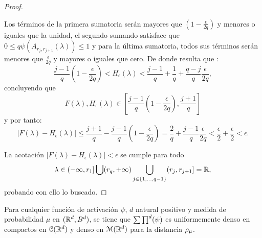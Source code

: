 \begin{proof}
\begin{itemize}
        Los términos de la primera sumatoria serán mayores que $\left(1-\frac{\epsilon}{2q} \right)$ y menores o iguales que la unidad, 
        el segundo sumando satisface que 
        $0 \leq q\psi( A_{r_j, r_{j+1}}(\lambda)) \leq 1$
        y para la última sumatoria, todos sus términos serán menores que $\frac{\epsilon}{2q}$ y mayores o iguales que cero.
        De donde resulta que : 
        \begin{equation}
            \frac{j-1}{q}\left(1-\frac{\epsilon}{2q} \right)  
            <
            H_\epsilon(\lambda) 
            <
            \frac{j-1}{q} 
            + 
            \frac{1}{q} 
            + 
            \frac{q-j}{q} \frac{\epsilon}{2q} ,
        \end{equation}
        concluyendo que 
        \begin{equation}
            F(\lambda), H_\epsilon(\lambda) 
            \in 
            \left[
                \frac{j-1}{q}\left(1-\frac{\epsilon}{2q}\right),
                \frac{j+1}{q}
            \right]
        \end{equation}
        y por tanto: 
        \begin{equation}
            | F(\lambda) - H_{\epsilon}(\lambda) | 
            \leq \frac{j+1}{q} -  \frac{j-1}{q}\left(1-\frac{\epsilon}{2q}\right)
            = 
            \frac{2}{q} + \frac{j-1}{q}\frac{\epsilon}{2q}
            < \frac{\epsilon}{2} + \frac{\epsilon}{2}
            < \epsilon.
        \end{equation}
    \end{itemize}
    La acotación $| F(\lambda) - H_{\epsilon}(\lambda) | < \epsilon$ se cumple para todo
    \begin{equation}
        \lambda \in (- \infty, r_1]
         \bigcup (r_q,+\infty) 
        \bigcup_{j \in \{1, ..., q-1\}} (r_{j},r_{j+1}] = \mathbb{R},
    \end{equation}
    probando con ello lo buscado.
\end{proof}      

\begin{teorema}\label{teorema:2_3_uniformemente_denso_compactos}
    Para cualquier función de activación $\psi$, $d$ natural positivo y
    medida de probabilidad $\mu$ en $(\mathbb{R}^d, B^d)$, 
    se tiene que $\sum \prod^d (\psi)$ es uniformemente denso en compactos
    en $\mathcal{C}(\mathbb{R}^d)$ y denso en $\mathcal{M}(\mathbb{R}^d)$ para la distancia $\rho_{\mu}$. 
\end{teorema}

